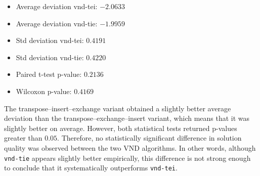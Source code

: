 \begin{itemize}[leftmargin=1.5em]
    \item Average deviation vnd-tei: \(-2.0633\)
    \item Average deviation vnd-tie: \(-1.9959\)
    \item Std deviation vnd-tei: \(0.4191\)
    \item Std deviation vnd-tie: \(0.4220\)
    \item Paired t-test p-value: \(0.2136\)
    \item Wilcoxon p-value: \(0.4169\)
\end{itemize}

The transpose--insert--exchange variant obtained a slightly better average deviation than the transpose--exchange--insert variant, which means that it was slightly better on average. However, both statistical tests returned p-values greater than \(0.05\). Therefore, no statistically significant difference in solution quality was observed between the two VND algorithms. In other words, although \texttt{vnd-tie} appears slightly better empirically, this difference is not strong enough to conclude that it systematically outperforms \texttt{vnd-tei}.